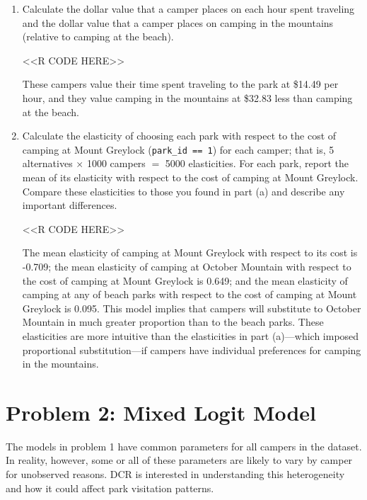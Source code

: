 \documentclass[11pt,letterpaper]{article}
\begin{document}
\begin{enumerate}[label=\alph*., leftmargin=*]
\begin{enumerate}[label=\roman*.]
		\item Calculate the dollar value that a camper places on each hour spent traveling and the dollar value that a camper places on camping in the mountains (relative to camping at the beach).

		<<R CODE HERE>>

		These campers value their time spent traveling to the park at \$14.49 per hour, and they value camping in the mountains at \$32.83 less than camping at the beach.

		\item Calculate the elasticity of choosing each park with respect to the cost of camping at Mount Greylock (\texttt{park\_id == 1}) for each camper; that is, 5 alternatives $\times$ 1000 campers $=$ 5000 elasticities. For each park, report the mean of its elasticity with respect to the cost of camping at Mount Greylock. Compare these elasticities to those you found in part (a) and describe any important differences.

		<<R CODE HERE>>

		The mean elasticity of camping at Mount Greylock with respect to its cost is -0.709; the mean elasticity of camping at October Mountain with respect to the cost of camping at Mount Greylock is 0.649; and the mean elasticity of camping at any of beach parks with respect to the cost of camping at Mount Greylock is 0.095. This model implies that campers will substitute to October Mountain in much greater proportion than to the beach parks. These elasticities are more intuitive than the elasticities in part (a)---which imposed proportional substitution---if campers have individual preferences for camping in the mountains.
	\end{enumerate}
\end{enumerate}

\section*{Problem 2: Mixed Logit Model}

The models in problem 1 have common parameters for all campers in the dataset. In reality, however, some or all of these parameters are likely to vary by camper for unobserved reasons. DCR is interested in understanding this heterogeneity and how it could affect park visitation patterns.
\end{document}
